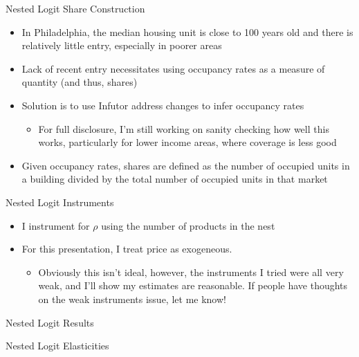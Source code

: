 \documentclass[10pt, xcolor=dvipsnames]{beamer}
\begin{document}
\begin{frame}{Nested Logit Share Construction}
    \begin{itemize}
        \item In Philadelphia, the median housing unit is close to 100 years old and there is relatively little entry, especially in poorer areas
        \item Lack of recent entry necessitates using occupancy rates as a measure of quantity (and thus, shares)
        \item Solution is to use Infutor address changes to infer occupancy rates
        \begin{itemize}
            \item For full disclosure, I'm still working on sanity checking how well this works, particularly for lower income areas, where coverage is less good
        \end{itemize}
        \item Given occupancy rates, shares are defined as the number of occupied units in a building divided by the total number of occupied units in that market
    \end{itemize}
    
\end{frame}

\begin{frame}{Nested Logit Instruments}
    \begin{itemize}
        \item I instrument for $\rho$ using the number of products in the nest
        \item For this presentation, I treat price as exogeneous.
        \begin{itemize}
            \item Obviously this isn't ideal, however, the instruments I tried were all very weak, and I'll show my estimates are reasonable. If people have thoughts on the weak instruments issue, let me know!
        \end{itemize}
    \end{itemize}
    
\end{frame}

\begin{frame}{Nested Logit Results}
    \small
    
\end{frame}

\begin{frame}{Nested Logit Elasticities}
    
\end{frame}
\end{document}
